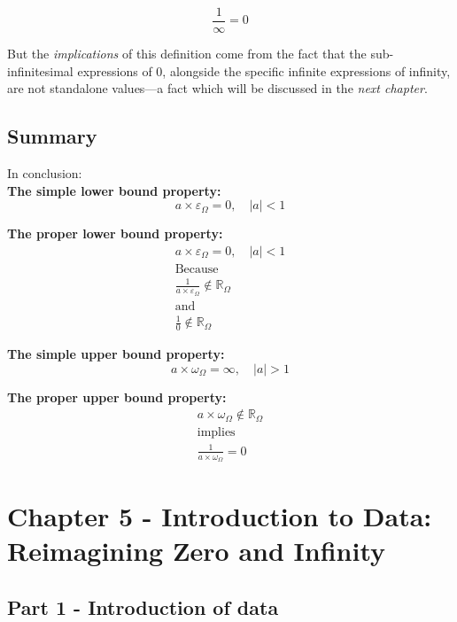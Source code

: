 \documentclass{article}
\begin{document}
$$\frac{1}{\infty} = 0$$

But the \textit{implications} of this definition come from the fact that the sub-infinitesimal expressions of $0$, alongside the specific infinite expressions of infinity, are not standalone values---a fact which will be discussed in the \textit{next chapter}.

\subsection{Summary} In conclusion:\\

\textbf{The simple lower bound property:}
$$a \times \varepsilon_\Omega = 0, \quad |a| < 1$$

\textbf{The proper lower bound property:}
\begin{gather*}
a \times \varepsilon_\Omega = 0, \quad |a| < 1 \\
\text{Because} \\
\frac{1}{a \times \varepsilon_\Omega} \notin \mathbb{R}_\Omega \\
\text{and} \\
\frac{1}{0} \notin \mathbb{R}_\Omega
\end{gather*}

\textbf{The simple upper bound property:}
$$a \times \omega_\Omega = \infty, \quad |a| > 1$$

\textbf{The proper upper bound property:}
\begin{gather*}
a \times \omega_\Omega \notin \mathbb{R}_\Omega \\
\text{implies} \\
\frac{1}{a \times \omega_\Omega} = 0
\end{gather*}

\section{Chapter 5 - Introduction to Data: Reimagining Zero and Infinity}

\subsection{Part 1 - Introduction of data}
\end{document}
